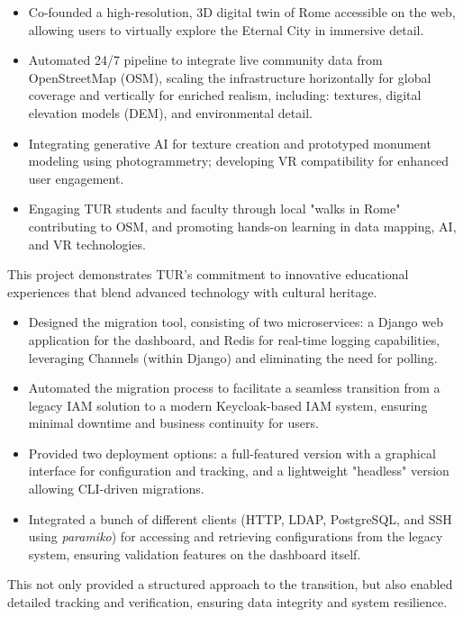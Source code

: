 	\begin{itemize}
		\item Co-founded a high-resolution, 3D digital twin of Rome accessible on the web, allowing users to virtually explore the Eternal City in immersive detail.
		\item Automated 24/7 pipeline to integrate live community data from OpenStreetMap (OSM), scaling the infrastructure horizontally for global coverage and vertically for enriched realism, including: textures, digital elevation models (DEM), and environmental detail.
		\item Integrating generative AI for texture creation and prototyped monument modeling using photogrammetry; developing VR compatibility for enhanced user engagement.
		\item Engaging TUR students and faculty through local "walks in Rome" contributing to OSM, and promoting hands-on learning in data mapping, AI, and VR technologies.
	\end{itemize}
	\smallskip
	This project demonstrates TUR's commitment to innovative educational experiences that blend advanced technology with cultural heritage.

	\divider

	\begin{itemize}
		\item Designed the migration tool, consisting of two microservices: a Django web application for the dashboard, and Redis for real-time logging capabilities, leveraging Channels (within Django) and eliminating the need for polling.
		\item Automated the migration process to facilitate a seamless transition from a legacy IAM solution to a modern Keycloak-based IAM system, ensuring minimal downtime and business continuity for users.
		\item Provided two deployment options: a full-featured version with a graphical interface for configuration and tracking, and a lightweight "headless" version allowing CLI-driven migrations.
		\item Integrated a bunch of different clients (HTTP, LDAP, PostgreSQL, and SSH using \emph{paramiko}) for accessing and retrieving configurations from the legacy system, ensuring validation features on the dashboard itself.
	\end{itemize}
	\smallskip
	This not only provided a structured approach to the transition, but also enabled detailed tracking and verification, ensuring data integrity and system resilience.

